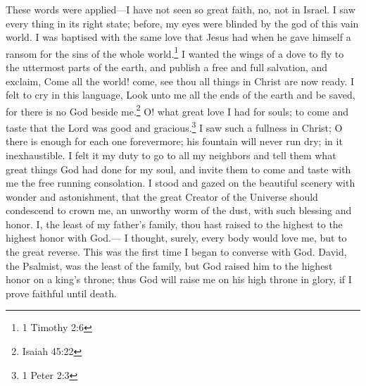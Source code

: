 These words were applied---I have not seen so great faith, no, not in Israel.
I saw every thing in its right state; before, my eyes were blinded by the god of this vain world.
I was baptised with the same love that Jesus had when he gave himself a ransom for the sins of the whole world.\footnote{1 Timothy 2:6}
I wanted the wings of a dove to fly to the uttermost parts of the earth, and publish a free and full salvation, and exclaim, Come all the world! come, see thou all things in Christ are now ready.
I felt to cry in this language, Look unto me all the ends of the earth and be saved, for there is no God beside me.\footnote{Isaiah 45:22}
O! what great love I had for souls; to come and taste that the Lord was good and gracious.\footnote{1 Peter 2:3}
I saw such a fullness in Christ; O there is enough for each one forevermore; his fountain will never run dry; in it inexhaustible.
I felt it my duty to go to all my neighbors and tell them what great things God had done for my soul, and invite them to come and taste with me the free running consolation.
I stood and gazed on the beautiful scenery with wonder and astonishment, that the great Creator of the Universe should condescend to crown me, an unworthy worm of the dust, with such blessing and honor.
I, the least of my father's family, thou hast raised to the highest to the highest honor with God.---%
I thought, surely, every body would love me, but to the great reverse.
This was the first time I began to converse with God.
David, the Psalmist, was the least of the family, but God raised him to the highest honor on a king's throne; thus God will raise me on his high throne in glory, if I prove faithful until death.